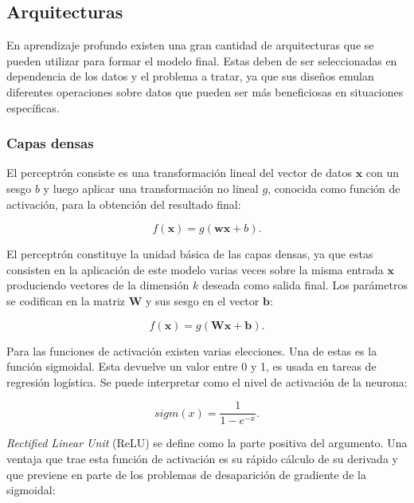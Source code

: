 \documentclass[a4paper,11pt,twocolumn,twoside]{article}
\begin{document}
\subsection{Arquitecturas}

En aprendizaje profundo existen una gran cantidad de arquitecturas que se pueden utilizar para formar el modelo 
final. Estas deben de ser seleccionadas en dependencia de los datos y el problema a tratar, ya que sus diseños 
emulan diferentes operaciones sobre datos que pueden ser más beneficiosas en situaciones específicas.

\subsubsection{Capas densas}

El perceptrón consiste es una transformación lineal del vector de datos $\textbf{x}$ con un sesgo $b$ y 
luego aplicar una transformación no lineal $g$, conocida como función de activación, 
para la obtención del resultado final:

\begin{equation}
	f(\textbf{x}) = g(\textbf{w}\textbf{x} + b).
\end{equation}

El perceptrón constituye la unidad básica de las capas densas, ya que estas consisten en la aplicación
de este modelo varias veces sobre la misma entrada $\textbf{x}$ produciendo vectores de la dimensión $k$
deseada como salida final. Los parámetros se codifican en la matriz $\textbf{W}$ y sus sesgo en el 
vector $\textbf{b}$:

\begin{equation}
	f(\textbf{x}) = g(\textbf{Wx} + \textbf{b}).
\end{equation}

Para las funciones de activación existen varias elecciones. Una de estas es la función sigmoidal. 
Esta devuelve un valor entre 0 y 1, es usada en tareas de regresión logística. 
Se puede interpretar como el nivel de activación de la neurona:

\begin{equation}
	sigm(x) = \frac{1}{1-e^{-x}}.
\end{equation}

\textit{Rectified Linear Unit} (ReLU) se define como la parte positiva del argumento. Una ventaja que trae esta 
función de activación es su rápido cálculo de su derivada y que previene en parte de los problemas 
de desaparición de gradiente de la sigmoidal:
\end{document}
